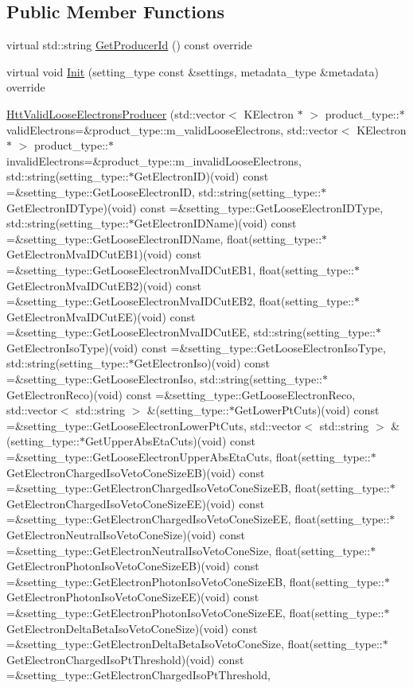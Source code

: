 \subsection*{Public Member Functions}
\begin{DoxyCompactItemize}
\item 
virtual std::string \hyperlink{classHttValidLooseElectronsProducer_ab185d483224e748d36cdd2af4b38dd08}{GetProducerId} () const override
\item 
virtual void \hyperlink{classHttValidLooseElectronsProducer_a5eadcc58c3d058258eb36c9d4ec17aa9}{Init} (setting\_\-type const \&settings, metadata\_\-type \&metadata) override
\item 
\hyperlink{classHttValidLooseElectronsProducer_ac2b54d97343624f4761102a45079ca70}{HttValidLooseElectronsProducer} (std::vector$<$ KElectron $\ast$ $>$ product\_\-type::$\ast$validElectrons=\&product\_\-type::m\_\-validLooseElectrons, std::vector$<$ KElectron $\ast$ $>$ product\_\-type::$\ast$invalidElectrons=\&product\_\-type::m\_\-invalidLooseElectrons, std::string(setting\_\-type::$\ast$GetElectronID)(void) const =\&setting\_\-type::GetLooseElectronID, std::string(setting\_\-type::$\ast$GetElectronIDType)(void) const =\&setting\_\-type::GetLooseElectronIDType, std::string(setting\_\-type::$\ast$GetElectronIDName)(void) const =\&setting\_\-type::GetLooseElectronIDName, float(setting\_\-type::$\ast$GetElectronMvaIDCutEB1)(void) const =\&setting\_\-type::GetLooseElectronMvaIDCutEB1, float(setting\_\-type::$\ast$GetElectronMvaIDCutEB2)(void) const =\&setting\_\-type::GetLooseElectronMvaIDCutEB2, float(setting\_\-type::$\ast$GetElectronMvaIDCutEE)(void) const =\&setting\_\-type::GetLooseElectronMvaIDCutEE, std::string(setting\_\-type::$\ast$GetElectronIsoType)(void) const =\&setting\_\-type::GetLooseElectronIsoType, std::string(setting\_\-type::$\ast$GetElectronIso)(void) const =\&setting\_\-type::GetLooseElectronIso, std::string(setting\_\-type::$\ast$GetElectronReco)(void) const =\&setting\_\-type::GetLooseElectronReco, std::vector$<$ std::string $>$ \&(setting\_\-type::$\ast$GetLowerPtCuts)(void) const =\&setting\_\-type::GetLooseElectronLowerPtCuts, std::vector$<$ std::string $>$ \&(setting\_\-type::$\ast$GetUpperAbsEtaCuts)(void) const =\&setting\_\-type::GetLooseElectronUpperAbsEtaCuts, float(setting\_\-type::$\ast$GetElectronChargedIsoVetoConeSizeEB)(void) const =\&setting\_\-type::GetElectronChargedIsoVetoConeSizeEB, float(setting\_\-type::$\ast$GetElectronChargedIsoVetoConeSizeEE)(void) const =\&setting\_\-type::GetElectronChargedIsoVetoConeSizeEE, float(setting\_\-type::$\ast$GetElectronNeutralIsoVetoConeSize)(void) const =\&setting\_\-type::GetElectronNeutralIsoVetoConeSize, float(setting\_\-type::$\ast$GetElectronPhotonIsoVetoConeSizeEB)(void) const =\&setting\_\-type::GetElectronPhotonIsoVetoConeSizeEB, float(setting\_\-type::$\ast$GetElectronPhotonIsoVetoConeSizeEE)(void) const =\&setting\_\-type::GetElectronPhotonIsoVetoConeSizeEE, float(setting\_\-type::$\ast$GetElectronDeltaBetaIsoVetoConeSize)(void) const =\&setting\_\-type::GetElectronDeltaBetaIsoVetoConeSize, float(setting\_\-type::$\ast$GetElectronChargedIsoPtThreshold)(void) const =\&setting\_\-type::GetElectronChargedIsoPtThreshold, 
\end{DoxyCompactItemize}
